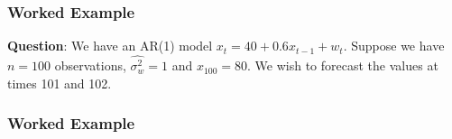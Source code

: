 \documentclass[%
xcolor=pdftex]{beamer}
\begin{document}
\begin{frame}
\frametitle{Worked Example}

\textbf{Question}: We have an AR(1) model $x_t = 40 + 0.6 x_{t-1} + w_t$. Suppose we have $n=100$ observations, $\hat{\sigma_w^2} = 1$ and $x_{100} = 80$. We wish to forecast the values at times 101 and 102.

\vspace{40mm}



\end{frame}

\begin{frame}
\frametitle{Worked Example}





\end{frame}
\end{document}
